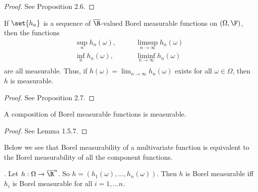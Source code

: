 \documentclass{article} %
\begin{document}
\begin{proof}
See \cite{folland1999real} Proposition 2.6.
\end{proof}

\begin{proposition}
If $\set{h_n}$ is a sequence of $\overline{\R}$-valued Borel measurable functions on $(\Omega, \F)$, then the functions
\begin{align*}
\sup_n h_n(\omega), & \quad \quad \limsup_{n \to \infty} h_n(\omega) \\
\inf_n h_n(\omega), & \quad \quad  \liminf_{n \to \infty} h_n(\omega) \\	
\end{align*}
are all measurable. Thus, if $h(\omega) = \lim_{n \to \infty} h_n(\omega)$ exists for all $\omega \in \Omega$, then $h$ is measurable.
\label{prop:borel_measurability_closed_under_inf_sup_liminf_limsup}
\end{proposition}

\begin{proof}
See \cite{folland1999real} Proposition 2.7.
\end{proof}

\begin{proposition} 
A composition of Borel measurable functions is measurable.
\label{prop:a_composition_of_Borel_measurable_functions_is_measurable}
\end{proposition}

\begin{proof}
See \cite{ash2000probability} Lemma 1.5.7.
\end{proof}


Below we see that Borel measurability of a multivariate function is equivalent to the Borel measurability of all the component functions.

\begin{proposition}
\cite[Thm.~1.5.8]{ash2000probability}.   Let $h : \Omega \to \overline{\R}^n$.  So $h=(h_1(\omega), \hdots, h_n(\omega))$.  Then $h$ is Borel measurable iff $h_i$ is Borel measurable for all $i=1,\hdots n$.  
\label{prop:multivariate_function_is_Borel_measurbale_iff_component_functions_are_Borel_measurable}
\end{proposition}
\end{document}
